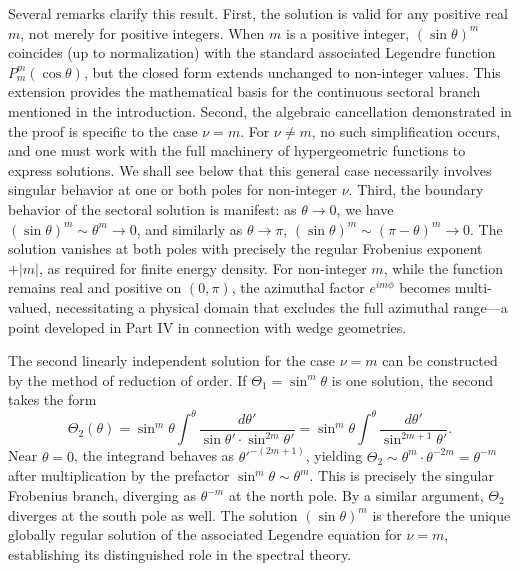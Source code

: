 \documentclass[
  aip,
  amsmath,amssymb,
  preprint
]{revtex4-1}
\begin{document}
Several remarks clarify this result. First, the solution is valid for any positive real $m$, not merely for positive integers. When $m$ is a positive integer, $(\sin\theta)^m$ coincides (up to normalization) with the standard associated Legendre function $P_m^m(\cos\theta)$, but the closed form extends unchanged to non-integer values. This extension provides the mathematical basis for the continuous sectoral branch mentioned in the introduction. Second, the algebraic cancellation demonstrated in the proof is specific to the case $\nu = m$. For $\nu \neq m$, no such simplification occurs, and one must work with the full machinery of hypergeometric functions to express solutions. We shall see below that this general case necessarily involves singular behavior at one or both poles for non-integer $\nu$. Third, the boundary behavior of the sectoral solution is manifest: as $\theta \to 0$, we have $(\sin\theta)^m \sim \theta^m \to 0$, and similarly as $\theta \to \pi$, $(\sin\theta)^m \sim (\pi-\theta)^m \to 0$. The solution vanishes at both poles with precisely the regular Frobenius exponent $+|m|$, as required for finite energy density. For non-integer $m$, while the function remains real and positive on $(0,\pi)$, the azimuthal factor $e^{im\phi}$ becomes multi-valued, necessitating a physical domain that excludes the full azimuthal range---a point developed in Part IV in connection with wedge geometries.

The second linearly independent solution for the case $\nu = m$ can be constructed by the method of reduction of order. If $\Theta_1 = \sin^m\theta$ is one solution, the second takes the form
\begin{equation}
\Theta_2(\theta) = \sin^m\theta \int^\theta \frac{d\theta'}{\sin\theta' \cdot \sin^{2m}\theta'} = \sin^m\theta \int^\theta \frac{d\theta'}{\sin^{2m+1}\theta'}.
\label{eq:second_solution_sectoral}
\end{equation}
Near $\theta = 0$, the integrand behaves as $\theta'^{-(2m+1)}$, yielding $\Theta_2 \sim \theta^m \cdot \theta^{-2m} = \theta^{-m}$ after multiplication by the prefactor $\sin^m\theta \sim \theta^m$. This is precisely the singular Frobenius branch, diverging as $\theta^{-m}$ at the north pole. By a similar argument, $\Theta_2$ diverges at the south pole as well. The solution $(\sin\theta)^m$ is therefore the unique globally regular solution of the associated Legendre equation for $\nu = m$, establishing its distinguished role in the spectral theory.

\end{document}
